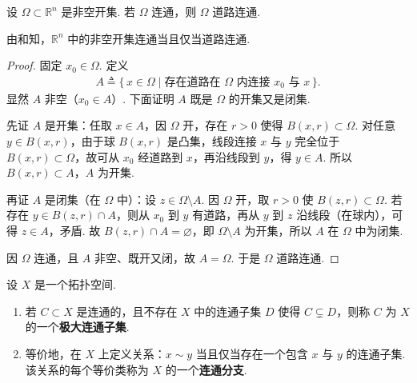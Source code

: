 \documentclass[../../main.tex]{subfiles}%
\begin{document}
\begin{proposition}\label{proposition:道路连通空间一定是连通空间-1}
设 $\Omega\subset \mathbb{R}^n$ 是非空开集. 若 $\Omega$ 连通，则 $\Omega$ 道路连通.
\end{proposition}
\begin{remark}
由和知，$\mathbb{R}^n$ 中的非空开集连通当且仅当道路连通.
\end{remark}
\begin{proof}
固定 $x_0\in \Omega$. 定义
\begin{align*}
A \triangleq \{\, x\in \Omega \mid \text{存在道路在 }\Omega\text{ 内连接 }x_0\text{ 与 }x\,\}.
\end{align*}
显然 $A$ 非空（$x_0\in A$）. 下面证明 $A$ 既是 $\Omega$ 的开集又是闭集.

先证 $A$ 是开集：任取 $x\in A$，因 $\Omega$ 开，存在 $r>0$ 使得 $B(x,r)\subset \Omega$. 对任意 $y\in B(x,r)$，由于球 $B(x,r)$ 是凸集，线段连接 $x$ 与 $y$ 完全位于 $B(x,r)\subset \Omega$，故可从 $x_0$ 经道路到 $x$，再沿线段到 $y$，得 $y\in A$. 所以 $B(x,r)\subset A$，$A$ 为开集.

再证 $A$ 是闭集（在 $\Omega$ 中）：设 $z\in \Omega\setminus A$. 因 $\Omega$ 开，取 $r>0$ 使 $B(z,r)\subset \Omega$. 若存在 $y\in B(z,r)\cap A$，则从 $x_0$ 到 $y$ 有道路，再从 $y$ 到 $z$ 沿线段（在球内），可得 $z\in A$，矛盾. 故 $B(z,r)\cap A=\varnothing$，即 $\Omega\setminus A$ 为开集，所以 $A$ 在 $\Omega$ 中为闭集.

因 $\Omega$ 连通，且 $A$ 非空、既开又闭，故 $A=\Omega$. 于是 $\Omega$ 道路连通.
\end{proof}

\begin{definition}
设 $X$ 是一个拓扑空间.
\begin{enumerate}[(1)]
\item 若 $C\subset X$ 是连通的，且不存在 $X$ 中的连通子集 $D$ 使得 $C\subsetneq D$，则称 $C$ 为 $X$ 的一个\textbf{极大连通子集}.
\item 等价地，在 $X$ 上定义关系：$x\sim y$ 当且仅当存在一个包含 $x$ 与 $y$ 的连通子集. 该关系的每个等价类称为 $X$ 的一个\textbf{连通分支}.
\end{enumerate}
\end{definition}
\end{document}
